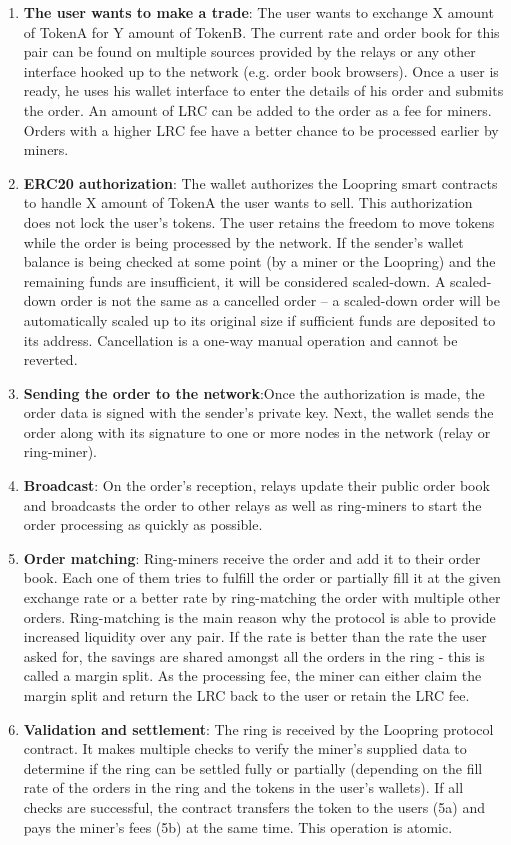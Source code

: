 \documentclass[UTF8,nofonts]{article}
\begin{document}
\begin{enumerate}
 \item \textbf{The user wants to make a trade}: The user wants to exchange X amount of TokenA for Y amount of TokenB. The current rate and order book for this pair can be found on multiple sources provided by the relays or any other interface hooked up to the network (e.g. order book browsers). Once a user is ready, he uses his wallet interface to enter the details of his order and submits the order. An amount of LRC can be added to the order as a fee for miners. Orders with a higher LRC fee have a better chance to be processed earlier by miners.
 \item \textbf{ERC20 authorization}: The wallet authorizes the Loopring smart contracts to handle X amount of TokenA the user wants to sell. This authorization does not lock the user's tokens. The user retains the freedom to move tokens while the order is being processed by the network. If the sender's wallet balance is being checked at some point (by a miner or the Loopring) and the remaining funds are insufficient, it will be considered scaled-down. A scaled-down order is not the same as a cancelled order – a scaled-down order will be automatically scaled up to its original size if sufficient funds are deposited to its address. Cancellation is a one-way manual operation and cannot be reverted.
 \item \textbf{Sending the order to the network}:Once the authorization is made, the order data is signed with the sender’s private key. Next, the wallet sends the order along with its signature to one or more nodes in the network (relay or ring-miner).
 \item \textbf{Broadcast}: On the order’s reception, relays update their public order book and broadcasts the order to other relays as well as ring-miners to start the order processing as quickly as possible.
 \item \textbf{Order matching}: Ring-miners receive the order and add it to their order book. Each one of them tries to fulfill the order or partially fill it at the given exchange rate or a better rate by ring-matching the order with multiple other orders. Ring-matching is the main reason why the protocol is able to provide increased liquidity over any pair. If the rate is better than the rate the user asked for, the savings are shared amongst all the orders in the ring - this is called a margin split. As the processing fee, the miner can either claim the margin split and return the LRC back to the user or retain the LRC fee.
 \item \textbf{Validation and settlement}: The ring is received by the Loopring protocol contract. It makes multiple checks to verify the miner's supplied data to determine if the ring can be settled fully or partially (depending on the fill rate of the orders in the ring and the tokens in the user’s wallets). If all checks are successful, the contract transfers the token to the users (5a) and pays the miner's fees (5b) at the same time. This operation is atomic.
\end{enumerate}
\end{document}
